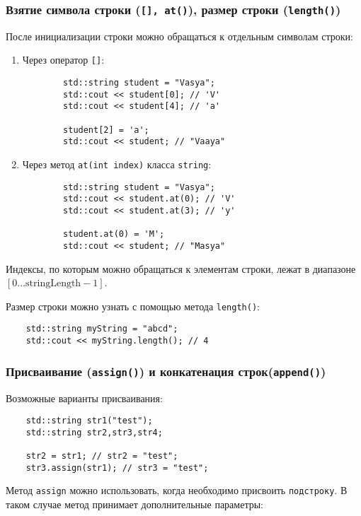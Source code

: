 \subsubsection{Взятие символа строки (\texttt{[], at()}), размер строки (\texttt{length()})}
После инициализации строки можно обращаться к отдельным символам строки:
\begin{enumerate}
    \item Через оператор \lstinline|[]|:
    \begin{lstlisting}
        std::string student = "Vasya";
        std::cout << student[0]; // 'V'
        std::cout << student[4]; // 'a'

        student[2] = 'a';
        std::cout << student; // "Vaaya"
    \end{lstlisting}
    \item Через метод \lstinline|at(int index)| класса \lstinline|string|:
    \begin{lstlisting}
        std::string student = "Vasya";
        std::cout << student.at(0); // 'V'
        std::cout << student.at(3); // 'y'

        student.at(0) = 'M';
        std::cout << student; // "Masya"
    \end{lstlisting}
\end{enumerate}

Индексы, по которым можно обращаться к элементам строки,
лежат в диапазоне~$\left[ 0 \ldots \text{stringLength} - 1 \right]$.

Размер строки можно узнать с помощью метода \lstinline|length()|:
\begin{lstlisting}
    std::string myString = "abcd";
    std::cout << myString.length(); // 4
\end{lstlisting}

\subsubsection{Присваивание (\texttt{assign()}) и конкатенация строк(\texttt{append()})}

Возможные варианты присваивания:
\begin{lstlisting}
    std::string str1("test");
    std::string str2,str3,str4;

    str2 = str1; // str2 = "test";
    str3.assign(str1); // str3 = "test";
\end{lstlisting}

Метод \lstinline|assign| можно использовать, когда необходимо присвоить \texttt{подстроку}. В таком случае метод принимает дополнительные параметры:

